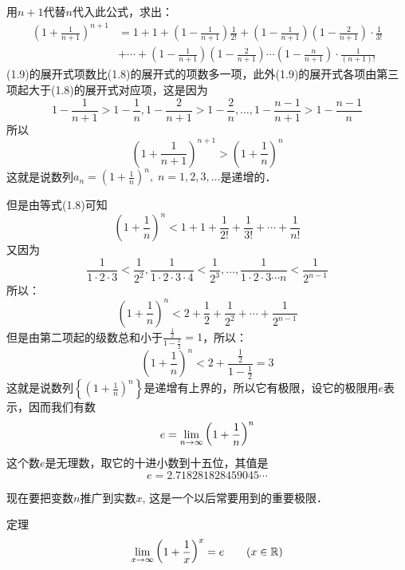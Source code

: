 用$n+1$代替$n$代入此公式，求出：
\begin{equation}
\begin{split}
    \left(1+\frac{1}{n+1}\right)^{n+1}&=1+1+\left(1-\frac{1}{n+1}\right)\frac{1}{2!}+ \left(1-\frac{1}{n+1}\right)\left(1-\frac{2}{n+1}\right)\cdot\frac{1}{3!}\\
    &+\cdots+ \left(1-\frac{1}{n+1}\right) \left(1-\frac{2}{n+1}\right)\cdots\left(1-\frac{n}{n+1}\right)\cdot\frac{1}{(n+1)!}  
\end{split}
\end{equation}
(1.9)的展开式项数比(1.8)的展开式的项数多一项，此外(1.9)的展开式各项由第三项起大于(1.8)的展开式对应项，这是因为
\[1-\frac{1}{n+1}>1-\frac{1}{n},1-\frac{2}{n+1}>1-\frac{2}{n},\ldots, 1-\frac{n-1}{n+1}>1-\frac{n-1}{n}\]
所以
\[\left(1+\frac{1}{n+1}\right)^{n+1}>\left(1+\frac{1}{n}\right)^n\]
这就是说数列$a_n=\left(1+\frac{1}{n}\right)^n,\; n=1,2,3,\ldots$是递增的．

但是由等式(1.8)可知
\[\left(1+\frac{1}{n}\right)^n<1+1+\frac{1}{2!}+\frac{1}{3!}+\cdots+\frac{1}{n!}\]
又因为
\[\frac{1}{1\cdot 2\cdot 3}<\frac{1}{2^2},\frac{1}{1\cdot 2\cdot 3\cdot 4}<\frac{1}{2^3},\ldots,\frac{1}{1\cdot 2\cdot 3\cdots n}<\frac{1}{2^{n-1}}\]
所以：
\[\left(1+\frac{1}{n}\right)^n<2+\frac{1}{2}+\frac{1}{2^2}+\cdots+\frac{1}{2^{n-1}}\]
但是由第二项起的级数总和小于$\frac{\tfrac{1}{2}}{1-\tfrac{1}{2}}=1$，所以：
\[\left(1+\frac{1}{n}\right)^n<2+\frac{\frac{1}{2}}{1-\frac{1}{2}}=3\]
这就是说数列$\left\{\left(1+\frac{1}{n}\right)^n\right\}$是递增有上界的，所以它有极限，设它的极限用$e$表示，因而我们有数
\[e=\displaystyle\lim_{n\to \infty} \left(1+\dfrac{1}{n}\right)^n\]
这个数$e$是无理数，取它的十进小数到十五位，其值是
\[e=2.718281828459045\cdots\]

现在要把变数$n$推广到实数$x$, 这是一个以后常要用到的重要极限．

\begin{blk}{定理}
\[\displaystyle\lim_{x\to \infty} \left(1+\dfrac{1}{x}\right)^x=e\qquad (x\in\mathbb{R})\] 
\end{blk}

